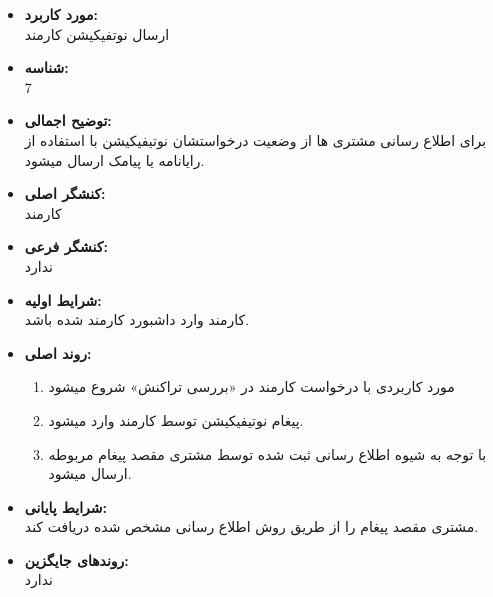 \documentclass{article}
\begin{document}
\begin{itemize}
\item \textbf{مورد کاربرد:}\\
ارسال نوتفیکیشن کارمند
\item \textbf{شناسه:}\\
7
\item \textbf{توضیح اجمالی:}\\
برای اطلاع رسانی مشتری ها از وضعیت درخواستشان نوتیفیکیشن با استفاده از رایانامه یا پیامک ارسال میشود.
\item \textbf{کنشگر اصلی:}\\
کارمند
\item \textbf{کنشگر فرعی:}\\
ندارد
\item \textbf{شرایط اولیه:}\\
کارمند وارد داشبورد کارمند شده باشد.
\item \textbf{روند اصلی:}\\
\begin{enumerate}
\item مورد کاربردی با درخواست کارمند در «بررسی تراکنش» شروع میشود
\item پیغام نوتیفیکیشن توسط کارمند وارد میشود.
\item با توجه به شیوه اطلاع رسانی ثبت شده توسط مشتری مقصد پیغام مربوطه ارسال میشود.
\end{enumerate}

\item \textbf{شرایط پایانی:}\\ 
مشتری مقصد پیغام را از طریق روش اطلاع رسانی مشخص شده دریافت کند.
\item \textbf{روندهای جایگزین:}\\
ندارد
\end{itemize}
\noindent\makebox[\linewidth]{\rule{\paperwidth}{0.4pt}}
\end{document}
